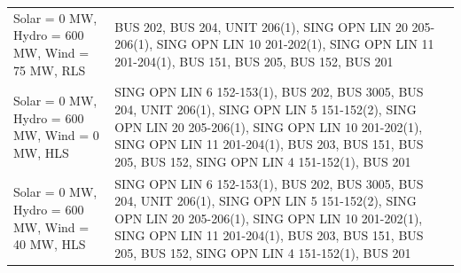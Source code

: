 \documentclass[10pt]{report}
\begin{document}
\begin{table}[H]
{\begin{tabular}{lp{15cm}}
Solar = 0 MW, Hydro = 600 MW, Wind = 75 MW, RLS & BUS 202, BUS 204, UNIT 206(1), SING OPN LIN   20 205-206(1), SING OPN LIN   10 201-202(1), SING OPN LIN   11 201-204(1), BUS 151, BUS 205, BUS 152, BUS 201 \\
Solar = 0 MW, Hydro = 600 MW, Wind = 0 MW, HLS & SING OPN LIN   6 152-153(1), BUS 202, BUS 3005, BUS 204, UNIT 206(1), SING OPN LIN   5 151-152(2), SING OPN LIN   20 205-206(1), SING OPN LIN   10 201-202(1), SING OPN LIN   11 201-204(1), BUS 203, BUS 151, BUS 205, BUS 152, SING OPN LIN   4 151-152(1), BUS 201 \\
Solar = 0 MW, Hydro = 600 MW, Wind = 40 MW, HLS & SING OPN LIN   6 152-153(1), BUS 202, BUS 3005, BUS 204, UNIT 206(1), SING OPN LIN   5 151-152(2), SING OPN LIN   20 205-206(1), SING OPN LIN   10 201-202(1), SING OPN LIN   11 201-204(1), BUS 203, BUS 151, BUS 205, BUS 152, SING OPN LIN   4 151-152(1), BUS 201 \\

\bottomrule
\end{tabular}}
\end{table}
\end{document}
